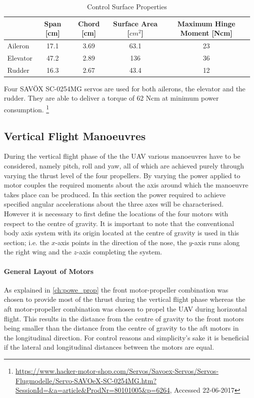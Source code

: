 
\begin{table}[htb]
    \centering
    \caption{Control Surface Properties}
    \label{tab:cont_surf}
    \begin{tabular}{lcccc}
      \toprule
        & Span [cm]& Chord [cm]& Surface Area [$cm^2$] & Maximum Hinge Moment [Ncm] \\
      \midrule
      Aileron & 17.1 & 3.69 & 63.1 &23\\\hdashline
      Elevator & 47.2 &2.89& 136  &36\\\hdashline
      Rudder & 16.3 & 2.67 & 43.4 &12\\\bottomrule
    \end{tabular}
\end{table}

Four SAVÖX SC-0254MG servos are used for both ailerons, the elevator and the rudder. They are able to deliver a torque of 62 Ncm at minimum power consumption. \footnote{\url{https://www.hacker-motor-shop.com/Servos/Savoex-Servos/Servos-Flugmodelle/Servo-SAVOeX-SC-0254MG.htm?SessionId=&a=article&ProdNr=80101005&p=6264}, Accessed 22-06-2017}

\subsection{Vertical Flight Manoeuvres} %

During the vertical flight phase of the the UAV various manoeuvres have to be considered, namely pitch, roll and yaw, all of which are achieved purely through varying the thrust level of the four propellers. By varying the power applied to motor couples the required moments about the axis around which the manoeuvre takes place can be produced. In this section the power required to achieve specified angular accelerations about the three axes will be characterised. However it is necessary to first define the locations of the four motors with respect to the centre of gravity. It is important to note that the conventional body axis system with its origin located at the centre of gravity is used in this section; i.e. the $x$-axis points in the direction of the nose, the $y$-axis runs along the right wing and the $z$-axis completing the system. 

\paragraph{General Layout of Motors}
As explained in \autoref{ch:powe_prop} the front motor-propeller combination was chosen to provide most of the thrust during the vertical flight phase whereas the aft motor-propeller combination was chosen to propel the UAV during horizontal flight. This results in the distance from the centre of gravity to the front motors being smaller than the distance from the centre of gravity to the aft motors in the longitudinal direction. For control reasons and simplicity's sake it is beneficial if the lateral and longitudinal distances between the motors are equal.

